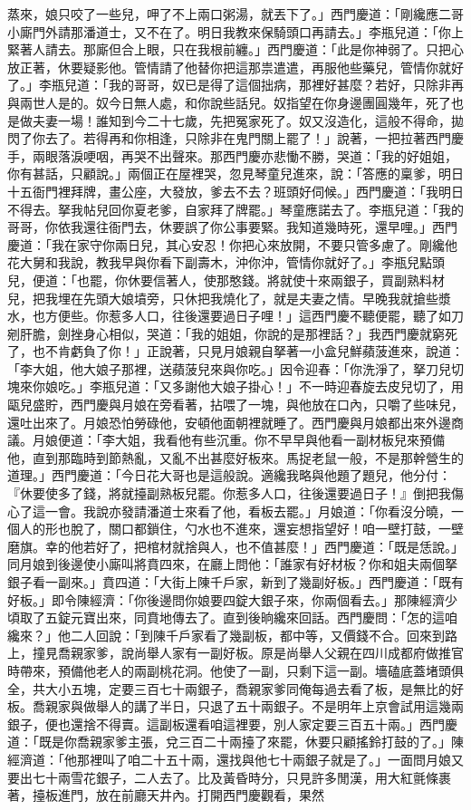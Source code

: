 \begin{showcontents}{}
蒸來，娘只咬了一些兒，呷了不上兩口粥湯，就丟下了。」西門慶道：「剛纔應二哥小廝門外請那潘道士，又不在了。明日我教來保騎頭口再請去。」李瓶兒道：「你上緊著人請去。那廝但合上眼，只在我根前纏。」西門慶道：「此是你神弱了。只把心放正著，休要疑影他。管情請了他替你把這那祟遣遣，再服他些藥兒，管情你就好了。」李瓶兒道：「我的哥哥，奴已是得了這個拙病，那裡好甚麼？若好，只除非再與兩世人是的。奴今日無人處，和你說些話兒。奴指望在你身邊團圓幾年，死了也是做夫妻一場！誰知到今二十七歲，先把冤家死了。奴又沒造化，這般不得命，拋閃了你去了。若得再和你相逢，只除非在鬼門關上罷了！」說著，一把拉著西門慶手，兩眼落淚哽咽，再哭不出聲來。那西門慶亦悲慟不勝，哭道：「我的好姐姐，你有甚話，只顧說。」兩個正在屋裡哭，忽見琴童兒進來，說：「答應的稟爹，明日十五衙門裡拜牌，畫公座，大發放，爹去不去？班頭好伺候。」西門慶道：「我明日不得去。拏我帖兒回你夏老爹，自家拜了牌罷。」琴童應諾去了。李瓶兒道：「我的哥哥，你依我還往衙門去，休要誤了你公事要緊。我知道幾時死，還早哩。」西門慶道：「我在家守你兩日兒，其心安忍！你把心來放開，不要只管多慮了。剛纔他花大舅和我說，教我早與你看下副壽木，沖你沖，管情你就好了。」李瓶兒點頭兒，便道：「也罷，你休要信著人，使那憨錢。將就使十來兩銀子，買副熟料材兒，把我埋在先頭大娘墳旁，只休把我燒化了，就是夫妻之情。早晚我就搶些漿水，也方便些。你惹多人口，往後還要過日子哩！」這西門慶不聽便罷，聽了如刀剜肝膽，劍挫身心相似，哭道：「我的姐姐，你說的是那裡話？」我西門慶就窮死了，也不肯虧負了你！」正說著，只見月娘親自拏著一小盒兒鮮蘋菠進來，說道：「李大姐，他大娘子那裡，送蘋菠兒來與你吃。」因令迎春：「你洗淨了，拏刀兒切塊來你娘吃。」李瓶兒道：「又多謝他大娘子掛心！」不一時迎春旋去皮兒切了，用甌兒盛貯，西門慶與月娘在旁看著，拈喂了一塊，與他放在口內，只嚼了些味兒，還吐出來了。月娘恐怕勞碌他，安頓他面朝裡就睡了。西門慶與月娘都出來外邊商議。月娘便道：「李大姐，我看他有些沉重。你不早早與他看一副材板兒來預備他，直到那臨時到節熱亂，又亂不出甚麼好板來。馬捉老鼠一般，不是那幹營生的道理。」西門慶道：「今日花大哥也是這般說。適纔我略與他題了題兒，他分付：『休要使多了錢，將就擡副熟板兒罷。你惹多人口，往後還要過日子！』倒把我傷心了這一會。我說亦發請潘道士來看了他，看板去罷。」月娘道：「你看沒分曉，一個人的形也脫了，關口都鎖住，勺水也不進來，還妄想指望好！咱一壁打鼓，一壁磨旗。幸的他若好了，把棺材就捨與人，也不值甚麼！」西門慶道：「既是恁說。」同月娘到後邊使小廝叫將賁四來，在廳上問他：「誰家有好材板？你和姐夫兩個拏銀子看一副來。」賁四道：「大街上陳千戶家，新到了幾副好板。」西門慶道：「既有好板。」即令陳經濟：「你後邊問你娘要四錠大銀子來，你兩個看去。」那陳經濟少頃取了五錠元寶出來，同賁地傳去了。直到後晌纔來回話。西門慶問：「怎的這咱纔來？」他二人回說：「到陳千戶家看了幾副板，都中等，又價錢不合。回來到路上，撞見喬親家爹，說尚舉人家有一副好板。原是尚舉人父親在四川成都府做推官時帶來，預備他老人的兩副桃花洞。他使了一副，只剩下這一副。墻磕底蓋堵頭俱全，共大小五塊，定要三百七十兩銀子，喬親家爹同俺每過去看了板，是無比的好板。喬親家與做舉人的講了半日，只退了五十兩銀子。不是明年上京會試用這幾兩銀子，便也還捨不得賣。這副板還看咱這裡要，別人家定要三百五十兩。」西門慶道：「既是你喬親家爹主張，兌三百二十兩擡了來罷，休要只顧搖鈴打鼓的了。」陳經濟道：「他那裡叫了咱二十五十兩，還找與他七十兩銀子就是了。」一面問月娘又要出七十兩雪花銀子，二人去了。比及黃昏時分，只見許多閒漢，用大紅氈條裹著，擡板進門，放在前廳天井內。打開西門慶觀看，果然
\end{showcontents}
